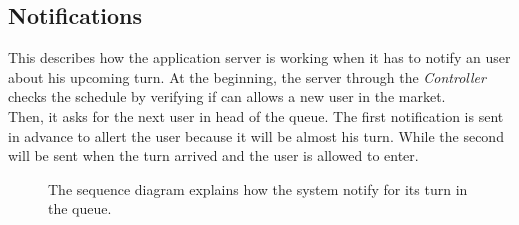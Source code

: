 \pagebreak

\subsection{Notifications}
This describes how the application server is working when it has to notify an user about his upcoming turn. At the beginning, the server through the \textit{Controller} checks the schedule by verifying if can allows a new user in the market.\\
Then, it asks for the next user in head of the queue. The first notification is sent in advance to allert the user because it will be almost his turn. While the second will be sent when the turn arrived and the user is allowed to enter. 

\begin{figure}[H]
  \label{NotificationsSD}
  \centering
    \caption{The sequence diagram explains how the system notify for its turn in the queue.}
\end{figure} 

\pagebreak


